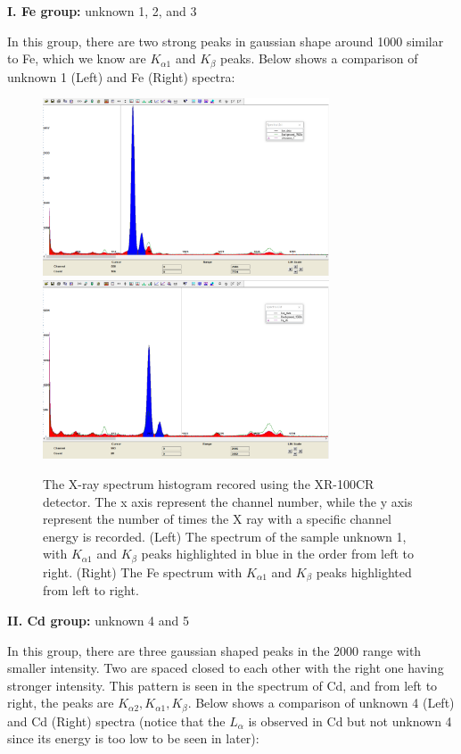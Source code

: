 \documentclass[12pt]{article}
\begin{document}
\textbf{I. Fe group:} unknown 1, 2, and 3

In this group, there are two strong peaks in gaussian shape around 1000 similar to Fe, which we know are $K_{\alpha1}$ and $K_{\beta}$ peaks. Below shows a comparison of unknown 1 (Left) and Fe (Right) spectra:


\begin{figure}[H]
\includegraphics[width=8.5cm]{U1}
\includegraphics[width=8.5cm]{Fe_26}
\label{Fig. 1}
\caption{The X-ray spectrum histogram recored using the XR-100CR detector. The x axis represent the channel number, while the y axis represent the number of times the X ray with a specific channel energy is recorded. (Left) The spectrum of the sample unknown 1, with $K_{\alpha 1}$ and $K_{\beta}$ peaks highlighted in blue in the order from left to right. (Right) The Fe spectrum with $K_{\alpha 1}$ and $K_{\beta}$ peaks highlighted from left to right.}
\end{figure}
\smallskip

\textbf{II. Cd group:} unknown 4 and 5

In this group, there are three gaussian shaped peaks in the 2000 range with smaller intensity. Two are spaced closed to each other with the right one having stronger intensity. This pattern is seen in the spectrum of Cd, and from left to right, the peaks are $K_{\alpha2}, K_{\alpha1}, K_{\beta}$. Below shows a comparison of unknown 4 (Left) and Cd (Right) spectra (notice that the $L_{\alpha}$ is observed in Cd but not unknown 4 since its energy is too low to be seen in later):
\end{document}
